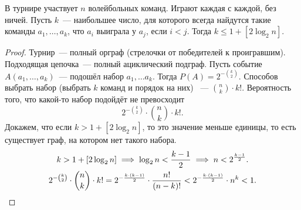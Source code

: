 \begin{theorem}
   В турнире участвует $n$ волейбольных команд. Играют каждая с каждой, без ничей. Пусть $k$~--- наибольшее число, для которого всегда найдутся такие команды $a_1,\ldots, a_k$, что $a_i$ выиграла у $a_j$, если $i < j$. Тогда $k \leq 1 + [2\log_2{n}]$.

\end{theorem}
\begin{proof}
    Турнир~--- полный орграф (стрелочки от победителей к проигравшим). Подходящая цепочка~--- полный ациклический подграф. Пусть событие
    $A(a_1, \ldots, a_k)$~--- подошёл набор $a_1, \ldots a_k$. Тогда
    $P(A) = 2^{- {\binom{k}{2}}}$.
    Способов выбрать набор (выбрать $k$ команд и порядок на них) ~--- ${\binom{n}{k}} \cdot k!$.
Вероятность того, что какой-то набор подойдёт не превосходит
    $$2^{-{\binom{k}{2}}}\cdot \binom{n}{k}\cdot k!.$$
    Докажем, что если $k > 1 + [2\log_2{n}]$, то это значение меньше единицы, то есть существует граф, на котором нет такого набора. 
    \begin{gather*}
        k > 1 + [2\log_2{n}] \implies \log_2 n < \frac{k - 1}{2} \implies n < 2^{\frac{k-1}{2}}.\\
    2^{-{\binom{k}{2}}}\cdot {\binom{n}{k}}\cdot k! = 2^{-\frac{k \cdot (k-1)}{2}}\cdot \frac{n!}{(n-k)!}< 2^{-\frac{k \cdot (k-1)}{2}}\cdot n^k < 1.
    \end{gather*}
\end{proof}
\newpage
